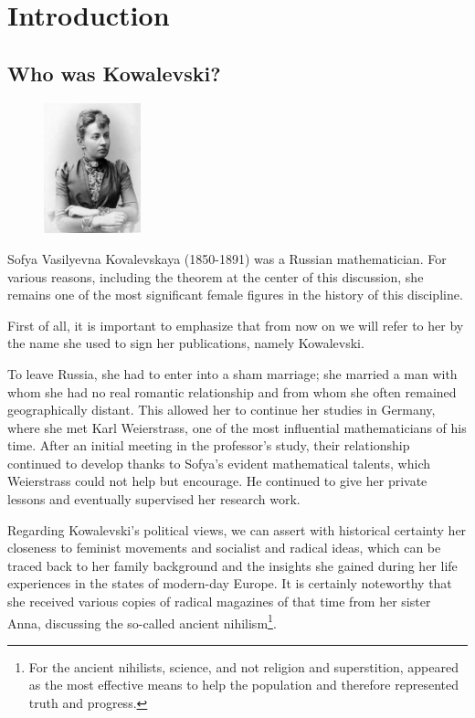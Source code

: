 \chapter{Introduction}

\section{Who was Kowalevski?}
\begin{figure}
\centering
\includegraphics[width=0.25\textwidth]{kovalevskaya_8}
\end{figure}

Sofya Vasilyevna Kovalevskaya (1850-1891) was a Russian mathematician. For various reasons, including the theorem at the center of this discussion, she remains one of the most significant female figures in the history of this discipline.

First of all, it is important to emphasize that from now on we will refer to her by the name she used to sign her publications, namely Kowalevski.

To leave Russia, she had to enter into a sham marriage; she married a man with whom she had no real romantic relationship and from whom she often remained geographically distant. This allowed her to continue her studies in Germany, where she met Karl Weierstrass, one of the most influential mathematicians of his time. After an initial meeting in the professor's study, their relationship continued to develop thanks to Sofya's evident mathematical talents, which Weierstrass could not help but encourage. He continued to give her private lessons and eventually supervised her research work.

Regarding Kowalevski's political views, we can assert with historical certainty her closeness to feminist movements and socialist and radical ideas, which can be traced back to her family background and the insights she gained during her life experiences in the states of modern-day Europe. It is certainly noteworthy that she received various copies of radical magazines of that time from her sister Anna, discussing the so-called ancient nihilism\footnote{For the ancient nihilists, science, and not religion and superstition, appeared as the most effective means to help the population and therefore represented truth and progress.}.

